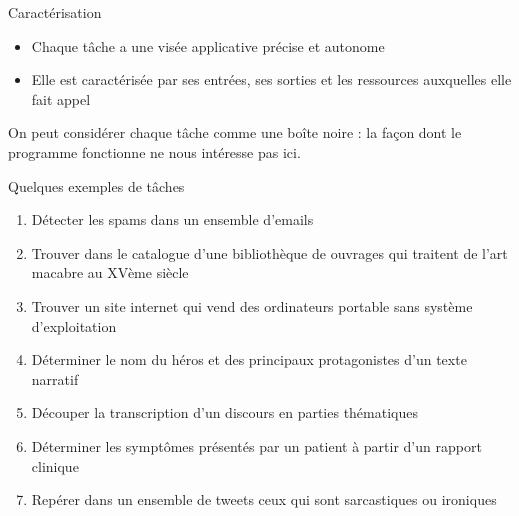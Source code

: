 \documentclass[hyperref={unicode}, xcolor={svgnames}, french]{beamer}
\begin{document}
\begin{frame}{Caractérisation}
    \begin{itemize}
        \item Chaque tâche a une visée applicative précise et autonome
        \item Elle est caractérisée par ses entrées, ses sorties et les ressources auxquelles elle fait appel
    \end{itemize}

    \begin{figure}
        \tikzset{external/export=true}
    \end{figure}

    On peut considérer chaque tâche comme une boîte noire : la façon dont le programme fonctionne ne nous intéresse pas ici.
\end{frame}

\begin{frame}{Quelques exemples de tâches}
    \begin{enumerate}
        \item Détecter les spams dans un ensemble d'emails
        \item Trouver dans le catalogue d'une bibliothèque de ouvrages qui traitent de l'art macabre au XVème siècle
        \item Trouver un site internet qui vend des ordinateurs portable sans système d'exploitation
        \item Déterminer le nom du héros et des principaux protagonistes d'un texte narratif
        \item Découper la transcription d'un discours en parties thématiques
        \item Déterminer les symptômes présentés par un patient à partir d'un rapport clinique
        \item Repérer dans un ensemble de tweets ceux qui sont sarcastiques ou ironiques
    \end{enumerate}
\end{frame}
\end{document}
